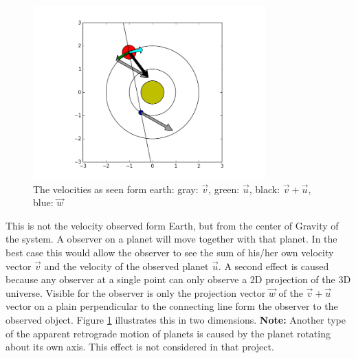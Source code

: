 \documentclass[a4paper,onesided,10pt]{article}
\begin{document}
\begin{figure}[h!]
	\centering
		\includegraphics[width=0.80\textwidth]{overview.png}
	\caption{The velocities as seen form earth: gray: $\vec{v}$, green: $\vec{u}$, black: $\vec{v}+\vec{u}$, blue: $\vec{w}$}
	\label{fig:overview}
\end{figure}

This is not the velocity observed form Earth, but from the center of Gravity of the system. A observer on a planet will move together with that planet. In the best case this would allow the observer to see the sum of his/her own velocity vector $\vec{v}$ and the velocity of the observed planet $\vec{u}$. A second effect is caused because any observer at a single point can only observe a 2D projection of the 3D universe. Visible for the observer is only the projection vector $\vec{w}$ of the $\vec{v}+\vec{u}$ vector on a plain perpendicular to the connecting line form the observer to the observed object. Figure \ref{fig:overview} illustrates this in two dimensions. \textbf{Note:} Another type of the apparent retrograde motion of planets is caused by the planet rotating about its own axis. This effect is not considered in that project.
\end{document}
